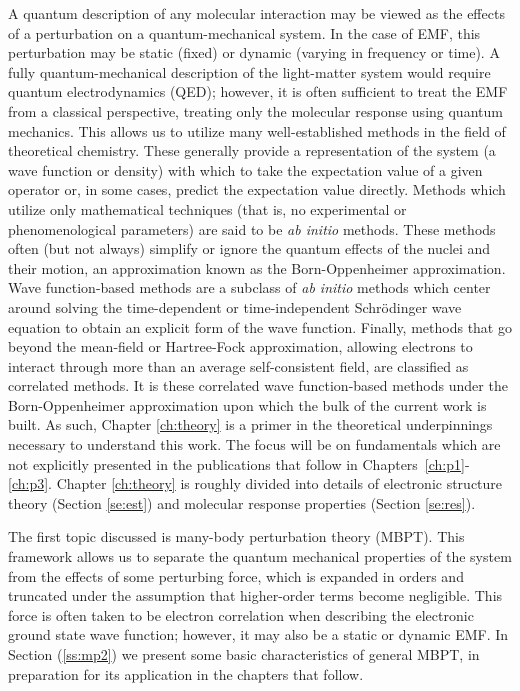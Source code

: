 A quantum description of any molecular interaction may be viewed as the
effects of a perturbation on a quantum-mechanical system. In the case of EMF,
this perturbation may be static (fixed) or dynamic (varying in frequency
or time). A fully quantum-mechanical description of the light-matter
system would require quantum electrodynamics (QED); however, it is often
sufficient to treat the EMF from a classical perspective, treating only the
molecular response using quantum mechanics.\cite{Barron2004,Helgaker2012}
This allows us to utilize many well-established methods in the field of
theoretical chemistry. These generally provide a representation of the
system (a wave function or density) with which to take the expectation
value of a given operator or, in some cases, predict the expectation value
directly.\cite{Szabo1996} Methods which utilize only mathematical techniques
(that is, no experimental or phenomenological parameters) are said to be
\textit{ab initio} methods. These methods often (but not always) simplify or
ignore the quantum effects of the nuclei and their motion, an approximation
known as the Born-Oppenheimer approximation.\cite{born1927zur} 
Wave function-based methods are a subclass of \textit{ab initio} methods 
which center around solving the
time-dependent or time-independent Schr\"odinger wave equation to obtain
an explicit form of the wave function.
Finally, methods that go beyond the mean-field or Hartree-Fock
approximation, allowing electrons to interact through more than an average
self-consistent field, are classified as correlated methods.  It is
these correlated wave function-based methods under the Born-Oppenheimer
approximation upon which the bulk of the current work is built. As such,
Chapter \ref{ch:theory} is a primer in the theoretical
underpinnings necessary to understand this work.  The focus will be
on fundamentals which are not explicitly presented in the publications
that follow in Chapters~\ref{ch:p1}-\ref{ch:p3}. Chapter \ref{ch:theory}
is roughly divided into details of electronic structure theory (Section
\ref{se:est}) and molecular response properties (Section \ref{se:res}).

The first topic discussed is many-body perturbation theory
(MBPT).\cite{Bartlett2009} This framework allows us to separate the quantum
mechanical properties of the system from the effects of some perturbing
force, which is expanded in orders and truncated under the assumption
that higher-order terms become negligible.  This force is often taken to
be electron correlation when describing the electronic ground state wave
function;\cite{Moller1934} however, it may also be a static or dynamic
EMF. In Section (\ref{ss:mp2}) we present some basic characteristics of
general MBPT, in preparation for its application in the chapters that follow.

